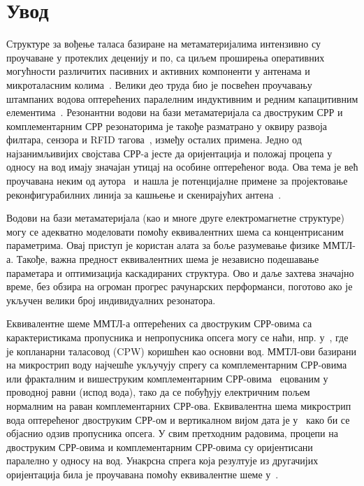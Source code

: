 \section{Увод}
Структуре за вођење таласа базиране на метаматеријалима интензивно су проучаване у протеклих деценију и по, са циљем проширења оперативних могућности различитих пасивних и активних компоненти у антенама и микроталасним колима~\cite{bib1}. Велики део труда био је посвећен проучавању штампаних водова оптерећених паралелним индуктивним и редним капацитивним елементима~\cite{bib2,bib3,bib4,caloz2005}. Резонантни водови на бази метаматеријала са двоструким СРР и комплементарним СРР резонаторима је такође разматрано у оквиру развоја филтара, сензора и RFID тагова~\cite{bib6,bib7,bib8}, између осталих примена. Једно од најзанимљивијих својстава СРР-а јесте да оријентација и положај процепа у односу на вод имају значајан утицај на особине оптерећеног вода. Ова тема је већ проучавана неким од аутора~\cite{bib9} и нашла је потенцијалне примене за пројектовање реконфигурабилних линија за кашњење и скенирајућих антена~\cite{bib10,bib11}.

Водови на бази метаматеријала (као и многе друге електромагнетне структуре) могу се адекватно моделовати помоћу еквивалентних шема са концентрисаним параметрима. Овај приступ је користан алата за боље разумевање физике ММТЛ-а. Такође, важна предност еквивалентних шема је независно подешавање параметара и оптимизација каскадираних структура. Ово и даље захтева значајно време, без обзира на огроман прогрес рачунарских перформанси, поготово ако је укључен велики број индивидуалних резонатора.

Еквивалентне шеме ММТЛ-а оптерећених са двоструким СРР-овима са карактеристикама пропусника и непропусника опсега могу се наћи, нпр. у~\cite{baena,aznar_improved}, где је копланарни таласовод (CPW) коришћен као основни вод. ММТЛ-ови базирани на микрострип воду најчешће укључују спрегу са комплементарним СРР-овима~\cite{bib14} или фракталним и вишеструким комплементарним СРР-овима~\cite{bib15} ецованим у проводној равни (испод вода), тако да се побуђују електричним пољем нормалним на раван комплементарних СРР-ова. Еквивалентна шема микрострип вода оптерећеног двоструким СРР-ом и вертикалном вијом дата је у~\cite{bib16} како би се објаснио одзив пропусника опсега. У свим претходним радовима, процепи на двоструким СРР-овима и комплементарним СРР-овима су оријентисани паралелно у односу на вод. Унакрсна спрега која резултује из другачијих оријентација била је проучавана помоћу еквивалентне шеме у~\cite{naqui:13}.

